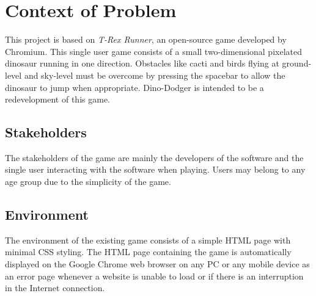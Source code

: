 \documentclass{article}
\begin{document}
\section{Context of Problem}
This project is based on \textit{T-Rex Runner}, an open-source game developed by Chromium. This single user game consists of a small two-dimensional pixelated dinosaur running in one direction. Obstacles like cacti and birds flying at ground-level and sky-level must be overcome by pressing the spacebar to allow the dinosaur to jump when appropriate. Dino-Dodger is intended to be a redevelopment of this game.
~\newline
\subsection*{Stakeholders}
The stakeholders of the game are mainly the developers of the software and the single user interacting with the software when playing. Users may belong to any age group due to the simplicity of the game. 
\subsection*{Environment}
The environment of the existing game consists of a simple HTML page with minimal CSS styling. The HTML page containing the game is automatically displayed on the Google Chrome web browser on any PC or any mobile device as an error page whenever a website is unable to load or if there is an interruption in the Internet connection. 





\end{document}
